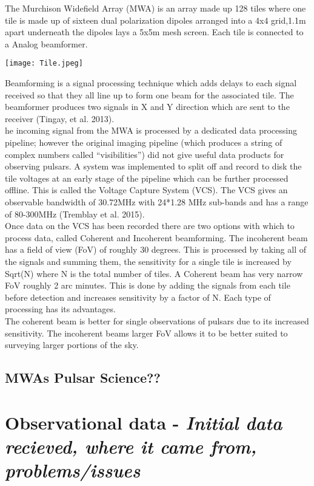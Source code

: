 \documentclass[draft]{article}
\newcommand{\pra}{\medskip\\}
\newcommand{\edit}[1]{\color{red}\textsl{#1}}
\begin{document}
The Murchison Widefield Array (MWA) is an array made up 128 tiles where one tile is made up of sixteen dual polarization dipoles arranged into a 4x4 grid,1.1m apart underneath the dipoles lays a 5x5m mesh screen. Each tile is connected to a Analog beamformer.
\begin{center}
\texttt{[image: Tile.jpeg]} 
\end{center}
Beamforming is a signal processing technique which adds delays to each signal received so that they all line up to form one beam for the associated tile. The beamformer produces two signals in X and Y direction  which are sent to the receiver (Tingay, et al. 2013). \pra
he incoming signal from the MWA is processed by a dedicated data processing pipeline; however the original imaging pipeline (which produces a string of complex numbers called “visibilities”) did not give useful data products for observing pulsars. A system was implemented to split off and record to disk the tile voltages at an early stage of the pipeline which can be further processed offline. This is called the Voltage Capture System (VCS). The VCS gives an observable bandwidth of 30.72MHz with 24*1.28 MHz sub-bands and has a range of 80-300MHz (Tremblay et al. 2015). \pra
Once data on the VCS has been recorded there are two options with which to process data, called Coherent and Incoherent beamforming. The incoherent beam has a field of view (FoV) of roughly 30 degrees. This is processed by taking all of the signals and summing them, the sensitivity for a single tile is increased by Sqrt(N) where N is the total number of tiles. A Coherent beam has very narrow FoV roughly 2 arc minutes. This is done by adding the signals from each tile before detection and increases sensitivity by a factor of N. Each type of processing has its advantages. \pra
The coherent beam is better for single observations of pulsars due to its increased sensitivity. The incoherent beams larger FoV allows it to be better suited to surveying larger portions of the sky. \pra


\subsection{MWAs Pulsar Science??}



\section{Observational data - \edit{Initial data recieved, where it came from, problems/issues}}
\end{document}
